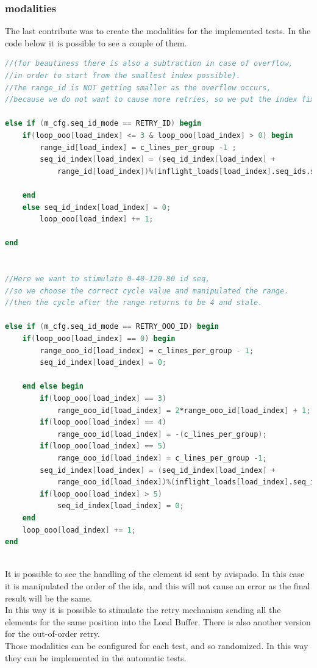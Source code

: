 \subsubsection{modalities}
The last contribute was to create the modalities for the implemented tests. In the code below it is possible to see a couple of them.\\

\linespread{1}
\begin{lstlisting}[language=Verilog,style=verilog-style, backgroundcolor=\color{lyel_palette}, frame=tlb]
//(for beautiness there is also a subtraction in case of overflow, 
//in order to start from the smallest index possible).
//The range_id is NOT getting smaller as the overflow occurs, 
//because we do not want to cause more retries, so we put the index fixed to 0

else if (m_cfg.seq_id_mode == RETRY_ID) begin
    if(loop_ooo[load_index] <= 3 & loop_ooo[load_index] > 0) begin
        range_id[load_index] = c_lines_per_group -1 ;
        seq_id_index[load_index] = (seq_id_index[load_index] +
            range_id[load_index])%(inflight_loads[load_index].seq_ids.size());
            
    end
    else seq_id_index[load_index] = 0;
        loop_ooo[load_index] += 1;
        
end


//Here we want to stimulate 0-40-120-80 id seq, 
//so we choose the correct cycle value and manipulated the range.
//then the cycle after the range returns to be 4 and stale.

else if (m_cfg.seq_id_mode == RETRY_OOO_ID) begin
    if(loop_ooo[load_index] == 0) begin
        range_ooo_id[load_index] = c_lines_per_group - 1;
        seq_id_index[load_index] = 0;

    end else begin
        if(loop_ooo[load_index] == 3) 
            range_ooo_id[load_index] = 2*range_ooo_id[load_index] + 1;
        if(loop_ooo[load_index] == 4) 
            range_ooo_id[load_index] = -(c_lines_per_group);
        if(loop_ooo[load_index] == 5) 
            range_ooo_id[load_index] = c_lines_per_group -1;
        seq_id_index[load_index] = (seq_id_index[load_index] +
            range_ooo_id[load_index])%(inflight_loads[load_index].seq_ids.size());
        if(loop_ooo[load_index] > 5) 
            seq_id_index[load_index] = 0;
    end
    loop_ooo[load_index] += 1;
end



\end{lstlisting}
\linespread{1.2}

It is possible to see the handling of the element id sent by avispado. In this case it is manipulated the order of the ids, and this will not cause an error as the final result will be the same.\\

In this way it is possible to stimulate the retry mechanism sending all the elements for the same position into the Load Buffer. There is also another version for the out-of-order retry.\\

Those modalities can be configured for each test, and so randomized. In this way they can be implemented in the automatic tests.
